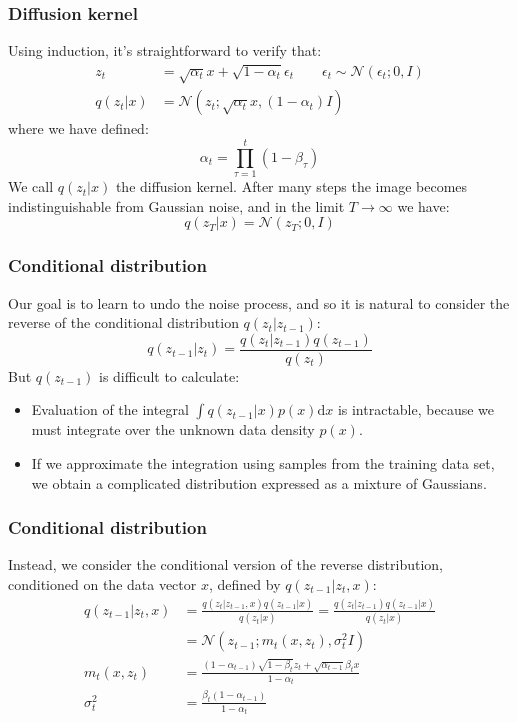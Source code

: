 \documentclass{beamer}
\begin{document}
\begin{frame}
    \frametitle{Diffusion kernel}
    Using induction, it's straightforward to verify that:
    \begin{align*}
        z_{t}&=\sqrt{\alpha_{t}}x+\sqrt{1-\alpha_{t}}\epsilon_{t}\qquad\epsilon_{t}\sim\mathcal{N}(\epsilon_{t};0,I) \\
        q(z_{t}|x)&=\mathcal{N}(z_{t};\sqrt{\alpha_{t}}x,(1-\alpha_{t})I)
    \end{align*}
    where we have defined:
    \begin{equation*}
        \alpha_{t}=\prod_{\tau=1}^{t}(1-\beta_{\tau})
    \end{equation*}
    We call $q(z_{t}|x)$ the diffusion kernel. After many steps the image becomes indistinguishable from Gaussian noise, and in the limit $T\to\infty$ we have:
    \begin{equation*}
        q(z_{T}|x)=\mathcal{N}(z_{T};0,I)
    \end{equation*}
\end{frame}

\begin{frame}
    \frametitle{Conditional distribution}
    Our goal is to learn to undo the noise process, and so it is natural to consider the reverse of the conditional distribution $q(z_{t}|z_{t-1})$:
    \begin{equation*}
        q(z_{t-1}|z_{t})=\frac{q(z_{t}|z_{t-1})q(z_{t-1})}{q(z_{t})}
    \end{equation*}
    But $q(z_{t-1})$ is difficult to calculate:
    \begin{itemize}
        \item Evaluation of the integral $\int{}q(z_{t-1}|x)p(x)\mathrm{d}x$ is intractable, because we must integrate over the unknown data density $p(x)$.
        \item If we approximate the integration using samples from the training data set, we obtain a complicated distribution expressed as a mixture of Gaussians.
    \end{itemize}
\end{frame}

\begin{frame}
    \frametitle{Conditional distribution}
    Instead, we consider the conditional version of the reverse distribution, conditioned on the data vector $x$, defined by $q(z_{t-1}|z_{t},x)$:
    \begin{align*}
        q(z_{t-1}|z_{t},x)&=\frac{q(z_{t}|z_{t-1},x)q(z_{t-1}|x)}{q(z_{t}|x)}=\frac{q(z_{t}|z_{t-1})q(z_{t-1}|x)}{q(z_{t}|x)} \\
        &=\mathcal{N}(z_{t-1};m_{t}(x,z_{t}),\sigma^{2}_{t}I) \\
        m_{t}(x,z_{t})&=\frac{(1-\alpha_{t-1})\sqrt{1-\beta_{t}}z_{t}+\sqrt{\alpha_{t-1}}\beta_{t}x}{1-\alpha_{t}} \\
        \sigma^{2}_{t}&=\frac{\beta_{t}(1-\alpha_{t-1})}{1-\alpha_{t}}
    \end{align*}
\end{frame}
\end{document}
